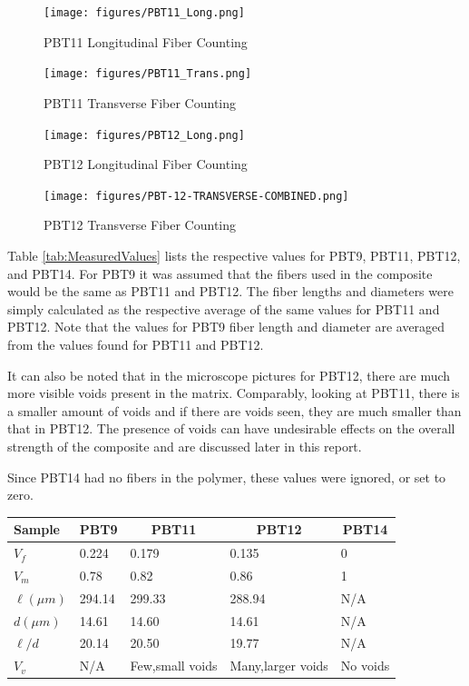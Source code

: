 \documentclass[11pt]{article}
\begin{document}
\begin{figure}[H]
\centering
\texttt{[image: figures/PBT11\_Long.png]}
\caption{PBT11 Longitudinal Fiber Counting}
\label{pbt11longcount}
\end{figure}
\begin{figure}[H]
\centering
\texttt{[image: figures/PBT11\_Trans.png]}
\caption{PBT11 Transverse Fiber Counting}
\label{pbt11transcount}
\end{figure}
\begin{figure}[H]
\centering
\texttt{[image: figures/PBT12\_Long.png]}
\caption{PBT12 Longitudinal Fiber Counting}
\label{pbt12longcount}
\end{figure}
\begin{figure}[H]
\centering
\texttt{[image: figures/PBT-12-TRANSVERSE-COMBINED.png]}
\caption{PBT12 Transverse Fiber Counting}
\label{pbt12transcount}
\end{figure}

Table \ref{tab:MeasuredValues} lists the respective values for PBT9, PBT11, PBT12, and PBT14. For PBT9 it was assumed that the fibers used in the composite would be the same as PBT11 and PBT12. The fiber lengths and diameters were simply calculated as the respective average of the same values for PBT11 and PBT12.  Note that the values for PBT9 fiber length and diameter are averaged from the values found for PBT11 and PBT12.

It can also be noted that in the microscope pictures for PBT12, there are much more visible voids present in the matrix. Comparably, looking at PBT11, there is a smaller amount of voids and if there are voids seen, they are much smaller than that in PBT12. The presence of voids can have undesirable effects on the overall strength of the composite and are discussed later in this report. 

Since PBT14 had no fibers in the polymer, these values were ignored, or set to zero.
\onehalfspacing
\begin{center}
 \label{tab:MeasuredValues}
\begin{tabular}{p{1.5cm} || p{} | p{} | p{} | p{}}
\hline
Sample & \multicolumn{1}{c|}{PBT9} & \multicolumn{1}{c|}{PBT11} & \multicolumn{1}{c|}{PBT12} & \multicolumn{1}{c}{PBT14} \\
\hline
\hline
\(V_f\) & 0.224 & 0.179 & 0.135 & 0\\
\(V_m\) & 0.78 & 0.82 & 0.86 & 1 \\
\(\ell (\mu m)\) & 294.14 & 299.33 & 288.94 & N/A\\
\(d (\mu m) \) & 14.61 & 14.60 & 14.61 & N/A\\
\(\ell /d\) & 20.14 & 20.50 & 19.77 & N/A\\
\(V_v\) & N/A & Few,small voids & Many,larger voids & No voids\\
\hline
\end{tabular}
\end{center}
\singlespacing
\vspace{1em}
\end{document}
